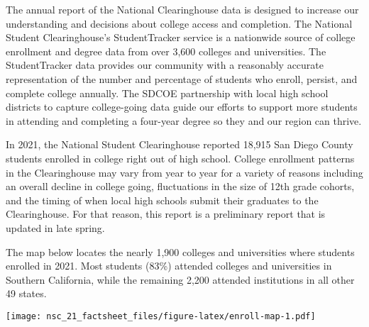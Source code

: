 \documentclass[
  11pt,
]{article}
\begin{document}
The annual report of the National Clearinghouse data is designed to
increase our understanding and decisions about college access and
completion. The National Student Clearinghouse's StudentTracker service
is a nationwide source of college enrollment and degree data from over
3,600 colleges and universities. The StudentTracker data provides our
community with a reasonably accurate representation of the number and
percentage of students who enroll, persist, and complete college
annually. The SDCOE partnership with local high school districts to
capture college-going data guide our efforts to support more students in
attending and completing a four-year degree so they and our region can
thrive.

\contactinfo{}

\newpage{}


In 2021, the National Student Clearinghouse reported 18,915 San Diego
County students enrolled in college right out of high school. College
enrollment patterns in the Clearinghouse may vary from year to year for
a variety of reasons including an overall decline in college going,
fluctuations in the size of 12th grade cohorts, and the timing of when
local high schools submit their graduates to the Clearinghouse. For that
reason, this report is a preliminary report that is updated in late
spring.

The map below locates the nearly 1,900 colleges and universities where
students enrolled in 2021. Most students (83\%) attended colleges and
universities in Southern California, while the remaining 2,200 attended
institutions in all other 49 states.


\texttt{[image: nsc\_21\_factsheet\_files/figure-latex/enroll-map-1.pdf]}

\newpage{}

\end{document}
